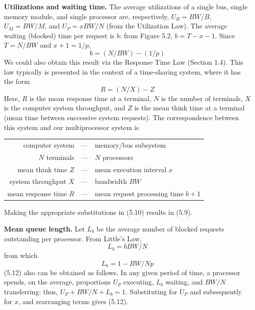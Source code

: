 \noindent\textbf{Utilizations and waiting time.} The average utilizations of a single bus,
single memory module, and single processor are, respectively, $U_B=BW/B$,
$U_M=BW/M$, and $U_P=xBW/N$ (from the Utilization Law). The average
waiting (blocked) time per request is $b$: from Figure 5.2, $b=T-x-1$. Since
$T=N/BW$ and $x+1=1/p$,
\begin{equation}
b=(N/BW)-(1/p)
\end{equation}
We could also obtain this result via the Response Time Law (Section 1.4).
This law typically is presented in the context of a time-sharing system,
where it has the form
\begin{equation}
R=(N/X)-Z
\end{equation}
Here, $R$ is the mean response time at a terminal, $N$ is the number of
terminals, $X$ is the computer system throughput, and $Z$ is the mean think
time at a terminal (mean time between successive system requests). The
correspondence between this system and our multiprocessor system is
\begin{center}
\begin{tabular}{rcl}
computer system & --- & memory/bus subsystem \\
$N$ terminals & --- & $N$ processors \\
mean think time $Z$ & --- & mean execution interval $x$ \\
system throughput $X$ & --- & bandwidth $BW$ \\
mean response time $R$ & --- & mean request processing time $b+1$
\end{tabular}
\end{center}
Making the appropriate substitutions in (5.10) results in (5.9).

\noindent\textbf{Mean queue length.} Let $L_b$ be the average number of blocked requests
outstanding per processor. From Little's Law,
\begin{equation}
L_b=bBW/N
\end{equation}
from which
\begin{equation}
L_b=1-BW/Np
\end{equation}
(5.12) also can be obtained as follows. In any given period of time, a processor
spends, on the average, proportions $U_P$ executing, $L_b$ waiting, and $BW/N$
transferring: thus, $U_P+BW/N+L_b=1$. Substituting for $U_P$ and subsequently
for $x$, and rearranging terms gives (5.12).

